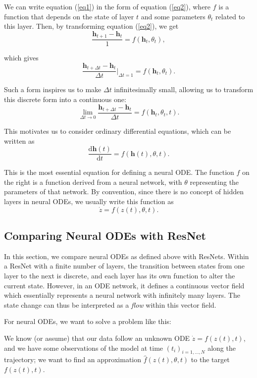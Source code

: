 \documentclass[a4paper,11pt,titlepage]{article}
\theoremstyle{definition}
\theoremstyle{plain}
\theoremstyle{remark}
\begin{document}
We can write equation (\ref{eq1}) in the form of equation (\ref{eq2}), where $f$ is a function that depends on the state of layer $t$ and some parameters $\theta_t$ related to this layer. Then, by transforming equation (\ref{eq2}), we get
$$\frac{\textbf{h}_{t+1} - \textbf{h}_t}{1}=f\left(\textbf{h}_t, \theta_t\right),$$

which gives
$$\frac{\textbf{h}_{t+\Delta t} - \textbf{h}_t }{\Delta t}\Bigg\rvert_{\Delta t=1}=f\left(\textbf{h}_t, \theta_t\right).$$

Such a form inspires us to make $\Delta t$ infinitesimally small, allowing us to transform this discrete form into a continuous one:
$$\lim_{\Delta t\to 0}\frac{\textbf{h}_{t+\Delta t} - \textbf{h}_t }{\Delta t}= f(\textbf{h}_t, \theta_t,t).$$

This motivates us to consider ordinary differential equations, which can be written as
$$\frac{\mathrm{d}{\textbf{h}}(t)}{\mathrm{d}t}=f(\textbf{h}(t),\theta,t).$$

This is the most essential equation for defining a neural ODE. The function $f$ on the right is a function derived from a neural network, with $\theta$ representing the parameters of that network. By convention, since there is no concept of hidden layers in neural ODEs, we usually write this function as
\begin{equation}
    \dot{z}=f(z(t),\theta,t).
    \label{nodeeqn}
\end{equation}

\subsection{Comparing Neural ODEs with ResNet}

In this section, we compare neural ODEs as defined above with ResNets. Within a ResNet with a finite number of layers, the transition between states from one layer to the next is discrete, and each layer has its own function to alter the current state. However, in an ODE network, it defines a continuous vector field which essentially represents a neural network with infinitely many layers. The state change can thus be interpreted as a \textit{flow} within this vector field.

For neural ODEs, we want to solve a problem like this: 

We know (or assume) that our data follow an unknown ODE $\dot{z}=f(z(t),t)$, and we have some observations of the model at time $(t_i)_{i=1,\dots,N}$ along the trajectory; we want to find an approximation $\hat{f}(z(t),\theta,t)$ to the target $f(z(t),t)$.
\end{document}
